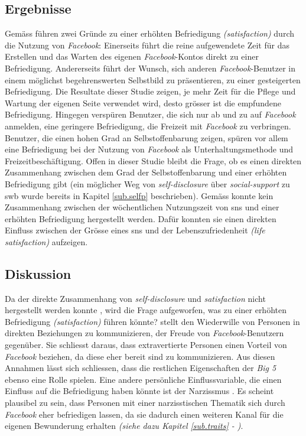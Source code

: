 \subsection{Ergebnisse}\label{subsec.amountErgebnisse}
Gemäss  führen zwei Gründe zu einer erhöhten Befriedigung \textit{(satisfaction)} durch die Nutzung von \textit{Facebook}: Einerseits führt die reine aufgewendete Zeit für das Erstellen und das Warten des eigenen \textit{Facebook}-Kontos direkt zu einer Befriedigung. Andererseits führt der Wunsch, sich anderen \textit{Facebook}-Benutzer in einem möglichst begehrenswerten Selbstbild zu präsentieren, zu einer gesteigerten Befriedigung. Die Resultate dieser  Studie zeigen, je mehr Zeit für die Pflege und Wartung der eigenen Seite verwendet wird, desto grösser ist die empfundene Befriedigung. Hingegen verspüren Benutzer, die sich nur ab und zu auf \textit{Facebook} anmelden, eine geringere Befriedigung, die Freizeit mit \textit{Facebook} zu verbringen. \newline
Benutzer, die einen hohen Grad an Selbstoffenbarung zeigen, spüren vor allem eine Befriedigung bei der Nutzung von \textit{Facebook} als Unterhaltungsmethode und Freizeitbeschäftigung. Offen in dieser Studie bleibt die Frage, ob es einen direkten Zusammenhang zwischen dem Grad der Selbstoffenbarung und einer erhöhten Befriedigung gibt (ein möglicher Weg von \textit{self-disclosure} über \textit{social-support} zu \gls{swb} wurde bereits in Kapitel \ref{sub.selfp} beschrieben).\newline
Gemäss  konnte kein Zusammenhang zwischen der wöchentlichen Nutzungszeit von \gls{sns} und einer erhöhten Befriedigung hergestellt werden. Dafür konnten sie einen direkten Einfluss zwischen der Grösse eines \gls{sns} und der Lebenszufriedenheit \textit{(life satisfaction)} aufzeigen.

\subsection{Diskussion}\label{subsec.amountDiskussion}
Da der direkte Zusammenhang von \textit{self-disclosure} und \textit{satisfaction} nicht hergestellt werden konnte \cite{Special:2012}, wird die Frage aufgeworfen, was zu einer erhöhten Befriedigung \textit{(satisfaction)} führen könnte?  stellt den Wiederwille von Personen in direkten Beziehungen zu kommunizieren, der Freude von \textit{Facebook}-Benutzern gegenüber. Sie schliesst daraus, dass extravertierte Personen einen Vorteil von \textit{Facebook} beziehen, da diese eher bereit sind zu kommunizieren. Aus diesen Annahmen lässt sich schliessen, dass die restlichen Eigenschaften der \textit{Big 5} ebenso eine Rolle spielen.\newline
Eine andere persönliche Einflussvariable, die einen Einfluss auf die Befriedigung haben könnte ist der Narzissmus \cite{Special:2012}. Es scheint plausibel zu sein, dass Personen mit einer narzisstischen Thematik sich durch \textit{Facebook} eher befriedigen lassen, da sie dadurch einen weiteren Kanal für die eigenen Bewunderung erhalten \textit{(siehe dazu Kapitel \ref{sub.traits} - )}.

